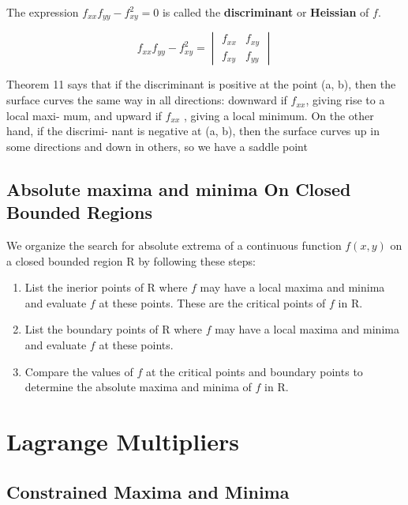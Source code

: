 \documentclass[12pt,a4paper]{article}
\begin{document}
The expression \(f_{xx}f_{yy}-f_{xy}^2 = 0\) is called the \textbf{discriminant} or \textbf{Heissian} of \(f\).

\[f_{xx}f_{yy}-f_{xy}^2  = \begin{vmatrix} f_{xx} & f_{xy} \\ f_{xy} & f_{yy} \end{vmatrix}\]

Theorem 11 says that if the discriminant is positive at the point (a, b), then the surface
curves the same way in all directions: downward if \(f_{xx}\), giving rise to a local maxi-
mum, and upward if  \(f_{xx}\) , giving a local minimum. On the other hand, if the discrimi-
nant is negative at (a, b), then the surface curves up in some directions and down in others,
so we have a saddle point

\subsection{Absolute maxima and minima On Closed Bounded Regions}


We organize the search for absolute extrema of a continuous function \(f(x,y)\) on a closed bounded region R by following these steps:

\begin{enumerate}
    \item List the inerior points of R where \(f\) may have a local maxima and minima and evaluate \(f\) at these points. These are the critical points of \(f\) in R.
    \item List the boundary points of R where \(f\) may have a local maxima and minima and evaluate \(f\) at these points. 
    \item Compare the values of \(f\) at the critical points and boundary points to determine the absolute maxima and minima of \(f\) in R.
\end{enumerate}

\section{Lagrange Multipliers}

\subsection{Constrained Maxima and Minima}
\end{document}
